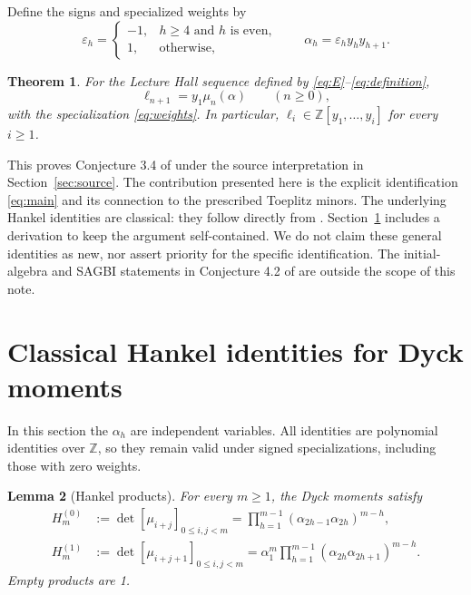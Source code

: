 \documentclass[11pt]{article}
\newtheorem{theorem}{Theorem}[section]
\newtheorem{lemma}[theorem]{Lemma}
\theoremstyle{remark}
\newcommand{\Z}{\mathbb Z}
\newcommand{\LH}{\ell}
\begin{document}
Define the signs and specialized weights by
\begin{equation}\label{eq:weights}
 \varepsilon_h=\begin{cases}-1,&h\ge4\text{ and }h\text{ is even},\\
 1,&\text{otherwise},\end{cases}
 \qquad \alpha_h=\varepsilon_h y_hy_{h+1}.
\end{equation}

\begin{theorem}\label{thm:main}
For the Lecture Hall sequence defined by \eqref{eq:E}--\eqref{eq:definition},
\begin{equation}\label{eq:main}
 \LH_{n+1}=y_1\mu_n(\alpha)\qquad(n\ge0),
\end{equation}
with the specialization \eqref{eq:weights}. In particular,
$\LH_i\in\Z[y_1,\ldots,y_i]$ for every $i\ge1$.
\end{theorem}

This proves Conjecture 3.4 of \cite{Katthan} under the source interpretation
in Section~\ref{sec:source}. The contribution presented here is the explicit
identification \eqref{eq:main} and its connection to the prescribed
Toeplitz minors. The underlying Hankel identities are classical: they
follow directly from \cite[Theorem 9.5(b,c)]{Sokal}. Section~\ref{sec:hankel}
includes a derivation to keep the argument self-contained. We do not
claim these general identities as new, nor assert priority for the
specific identification. The initial-algebra and SAGBI statements in
Conjecture 4.2 of \cite{Katthan} are outside the scope of this note.

\section{Classical Hankel identities for Dyck moments}\label{sec:hankel}

In this section the $\alpha_h$ are independent variables. All identities
are polynomial identities over $\Z$, so they remain valid under signed
specializations, including those with zero weights.

\begin{lemma}[Hankel products]\label{lem:hankel}
For every $m\ge1$, the Dyck moments satisfy
\begin{align}
 H_m^{(0)}&:=\det[\mu_{i+j}]_{0\le i,j<m}
   =\prod_{h=1}^{m-1}(\alpha_{2h-1}\alpha_{2h})^{m-h},\label{eq:H0}\\
 H_m^{(1)}&:=\det[\mu_{i+j+1}]_{0\le i,j<m}
   =\alpha_1^m\prod_{h=1}^{m-1}
       (\alpha_{2h}\alpha_{2h+1})^{m-h}.\label{eq:H1}
\end{align}
Empty products are 1.
\end{lemma}
\end{document}
